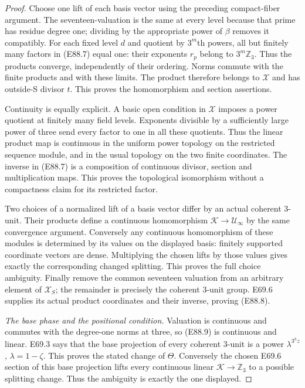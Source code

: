 \begin{proof}
Choose one lift of each basis
vector using the preceding
compact-fiber argument. The
seventeen-valuation is the same
at every level because that
prime has residue degree one;
dividing by the appropriate
power of $\beta$ removes it
compatibly. For each fixed
level $d$ and quotient by
$3^m$th powers, all but
finitely many factors in
(E88.7) equal one: their
exponents $r_p$ belong to
$3^m\mathbb Z_3$. Thus the
products converge, independently
of their ordering. Norms commute
with the finite products and
with these limits. The product
therefore belongs to $\mathcal X$
and has outside-S divisor $t$.
This proves the homomorphism
and section assertions.

Continuity is equally explicit.
A basic open condition in
$\mathcal X$ imposes a power
quotient at finitely many field
levels. Exponents divisible by
a sufficiently large power of
three send every factor to one
in all these quotients. Thus
the linear product map is
continuous in the uniform
power topology on the restricted
sequence module, and in the
usual topology on the two
finite coordinates. The inverse
in (E88.7) is a composition
of continuous divisor,
section and multiplication
maps. This proves the
topological isomorphism without
a compactness claim for its
restricted factor.

Two choices of a normalized
lift of a basis vector differ
by an actual coherent $3$-unit.
Their products define a
continuous homomorphism
$\mathcal K\to\mathcal U_\infty$
by the same convergence
argument. Conversely any
continuous homomorphism of
these modules is determined
by its values on the displayed
basis: finitely supported
coordinate vectors are dense.
Multiplying the chosen lifts
by those values gives exactly
the corresponding changed
splitting. This proves the
full choice ambiguity. Finally
remove the common seventeen
valuation from an arbitrary
element of $\mathcal X_S$;
the remainder is precisely
the coherent $3$-unit group.
E69.6 supplies its actual
product coordinates and their
inverse, proving (E88.8).

\emph{The base phase and the positional condition.}
Valuation is continuous and
commutes with the degree-one
norms at three, so (E88.9)
is continuous and linear.
E69.3 says that the base
projection of every coherent
$3$-unit is a power
$\lambda^{3^h z}$,
$\lambda=1-\zeta$.
This proves the stated
change of $\Theta$. Conversely
the chosen E69.6 section of
this base projection lifts
every continuous linear
$\mathcal K\to\mathbb Z_3$
to a possible splitting change.
Thus the ambiguity is exactly
the one displayed.


\end{proof}
